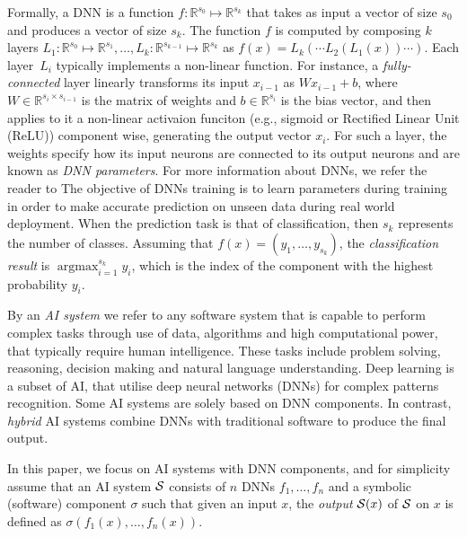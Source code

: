 \documentclass[10pt, conference, a4paper, final]{IEEEtran}
\begin{document}
Formally, a DNN is a function $f\colon\mathbb{R}^{s_0}\mapsto \mathbb{R}^{s_k}$ that takes as input a vector of size $s_0$ and produces a vector of size $s_k$. The function $f$ is computed by composing $k$ layers $L_1\colon\mathbb{R}^{s_0} \mapsto\mathbb{R}^{s_1}, \dots, L_k\colon\mathbb{R}^{s_{k-1}}\mapsto\mathbb{R}^{s_k}$ as $f(x) = L_k(\cdots L_2(L_1(x))\cdots)$.
%
Each layer~$L_i$ typically implements a non-linear function. For instance, a \emph{fully-connected} layer linearly transforms its input $x_{i-1}$ as $W x_{i-1} + b$, where $W\in\mathbb{R}^{s_{i} \times s_{i-1}}$ is the matrix of weights and $b\in\mathbb{R}^{s_i}$ is the bias vector, and then applies to it a non-linear activaion funciton (e.g., sigmoid or Rectified Linear Unit (ReLU)) component wise, generating the output vector $x_i$. For such a layer, the weights specify how its input neurons are connected to its output neurons and are known as \emph{DNN parameters}. For more information about DNNs, we refer the reader to \cite{dnn_archi}
%
The objective of DNNs training is to learn parameters during training in order to make accurate prediction on unseen data during real world deployment.
%
When the prediction task is that of classification, then $s_k$ represents the number of classes. Assuming that $f(x) = (y_1,\dots,y_{s_k})$, the \emph{classification result} is $\displaystyle\mathop{\text{argmax}}_{i=1}^{s_k} y_i$, which is the index of the component with the highest probability $y_i$.



By an \emph{AI system} we refer to any software system that is capable to perform complex tasks through use of data, algorithms and high computational power, that typically require human intelligence. These tasks include problem solving, reasoning, decision making and natural language understanding.
%
Deep learning is a subset of AI, that utilise  deep neural networks (DNNs) for complex patterns recognition. Some AI systems are solely based on DNN components. In contrast, \emph{hybrid} AI systems combine DNNs with traditional software to produce the final output.

In this paper, we focus on AI systems with DNN components, and for simplicity assume that an AI system $\S$ consists of $n$ DNNs $f_1,\dots,f_n$ and a symbolic (software) component $\sigma$ such that given an input $x$, the \emph{output} $\S(x)$ of $\S$ on $x$ is defined as $\sigma(f_1(x),\dots,f_n(x))$.
\end{document}
